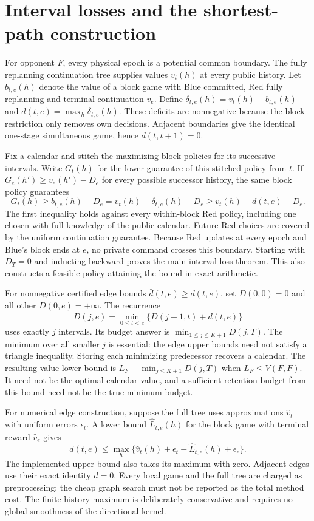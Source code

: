 \section{Interval losses and the shortest-path construction}
For opponent $F$, every physical epoch is a potential common boundary. The
fully replanning continuation tree supplies values $v_t(h)$ at every public
history. Let $b_{t,e}(h)$ denote the value of a block game with Blue committed,
Red fully replanning and terminal continuation $v_e$. Define
$\delta_{t,e}(h)=v_t(h)-b_{t,e}(h)$ and
$d(t,e)=\max_h\delta_{t,e}(h)$. These deficits are nonnegative because the
block restriction only removes own decisions. Adjacent boundaries give the
identical one-stage simultaneous game, hence $d(t,t+1)=0$.

Fix a calendar and stitch the maximizing block policies for its successive
intervals. Write $G_t(h)$ for the lower guarantee of this stitched policy
from $t$. If $G_e(h')\ge v_e(h')-D_e$ for every possible successor history,
the same block policy guarantees
\[
 G_t(h)\ge b_{t,e}(h)-D_e
       =v_t(h)-\delta_{t,e}(h)-D_e
       \ge v_t(h)-d(t,e)-D_e.
\]
The first inequality holds against every within-block Red policy, including
one chosen with full knowledge of the public calendar. Future Red choices
are covered by the uniform continuation guarantee. Because Red updates at
every epoch and Blue's block ends at $e$, no private command crosses this
boundary. Starting with $D_T=0$ and inducting backward proves the main
interval-loss theorem. This also constructs a feasible policy attaining
the bound in exact arithmetic.

For nonnegative certified edge bounds $\bar d(t,e)\ge d(t,e)$, set
$D(0,0)=0$ and all other $D(0,e)=+\infty$. The recurrence
\[
 D(j,e)=\min_{0\le t<e}\{D(j-1,t)+\bar d(t,e)\}
\]
uses exactly $j$ intervals. Its budget answer is
$\min_{1\le j\le K+1}D(j,T)$. The minimum over all smaller $j$ is essential:
the edge upper bounds need not satisfy a triangle inequality. Storing each
minimizing predecessor recovers a calendar. The resulting value lower bound
is $L_F-\min_{j\le K+1}D(j,T)$ when $L_F\le V(F,F)$. It need not be the
optimal calendar value, and a sufficient retention budget from this bound
need not be the true minimum budget.

For numerical edge construction, suppose the full tree uses approximations
$\widehat v_t$ with uniform errors $\epsilon_t$. A lower bound
$\widehat L_{t,e}(h)$ for the block game with terminal reward
$\widehat v_e$ gives
\[
 d(t,e)\le\max_h\{
 \widehat v_t(h)+\epsilon_t-\widehat L_{t,e}(h)+\epsilon_e\}.
\]
The implemented upper bound also takes its maximum with zero. Adjacent
edges use their exact identity $d=0$. Every local game and the full tree
are charged as preprocessing; the cheap graph search must not be reported
as the total method cost. The finite-history maximum is deliberately
conservative and requires no global smoothness of the directional kernel.

